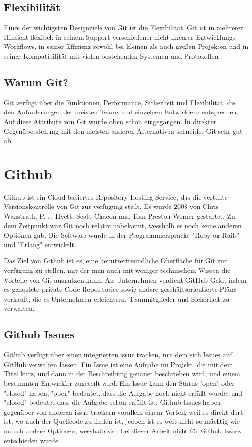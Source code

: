 \subsection{Flexibilität}

Eines der wichtigsten Designziele von Git ist die Flexibilität. Git ist in mehrerer Hinsicht flexibel: in seinem Support verschiedener nicht-linearer Entwicklungs-Workflows, 
in seiner Effizienz sowohl bei kleinen als auch großen Projekten und in seiner Kompatibilität mit vielen bestehenden Systemen und Protokollen.
\cite{sysarch-git-1}

\subsection{Warum Git?}

Git verfügt über die Funktionen, Performance, Sicherheit und Flexibilität, die den Anforderungen der meisten Teams und einzelnen Entwicklern entsprechen. 
Auf diese Attribute von Git wurde oben schon eingegangen. In direkter Gegenüberstellung mit den meisten anderen Alternativen schneidet Git sehr gut ab.
\cite{sysarch-git-1}

\section{Github}

Github ist ein Cloud-basiertes Repository Hosting Service, das die verteilte Versionskontrolle von Git zur verfügung stellt. Es wurde 2008 von Chris Wanstrath, P. J. Hyett, 
Scott Chacon und Tom Preston-Werner gestartet. Zu dem Zeitpunkt war Git noch relativ unbekannt, wesshalb es noch keine anderen Optionen gab. Die Software wurde in der 
Programmiersprache "Ruby on Rails" und "Erlang" entwickelt. 
\cite{sysarch-github-1}

Das Ziel von Github ist es, eine benutzerfreundliche Oberfläche für Git zur verfügung zu stellen, mit der man auch mit weniger technischem Wissen die Vorteile von Git ausnutzen kann.
Als Unternehmen verdient GitHub Geld, indem es gehostete private Code-Repositories sowie andere geschäftsorientierte Pläne verkauft, 
die es Unternehmen erleichtern, Teammitglieder und Sicherheit zu verwalten.
\cite{sysarch-github-2}

\subsection{Github Issues}

Github verfügt über einen integrierten issue tracken, mit dem sich Issues auf GitHub verwalten lassen. Ein Issue ist eine 
Aufgabe im Projekt, die mit dem Titel kurz, und dann in der Beschreibung genauer beschrieben wird, und einem bestimmten Entwickler 
zugeteilt wird. Ein Issue kann den Status "open" oder "closed" haben, "open" bedeutet, dass die Aufgabe noch nicht erfüllt wurde, und 
"closed" bedeutet dass die Aufgabe schon erfüllt ist. Github Issues haben gegenüber von anderen issue trackern vorallem einem Vorteil, 
weil es direkt dort ist, wo auch der Quellcode zu finden ist, jedoch ist es weit nicht so mächtig wie manch andere Optionen, wesshalb 
sich bei dieser Arbeit nicht für Github Issues entschieden wurde.
\cite{sysarch-github-3}

